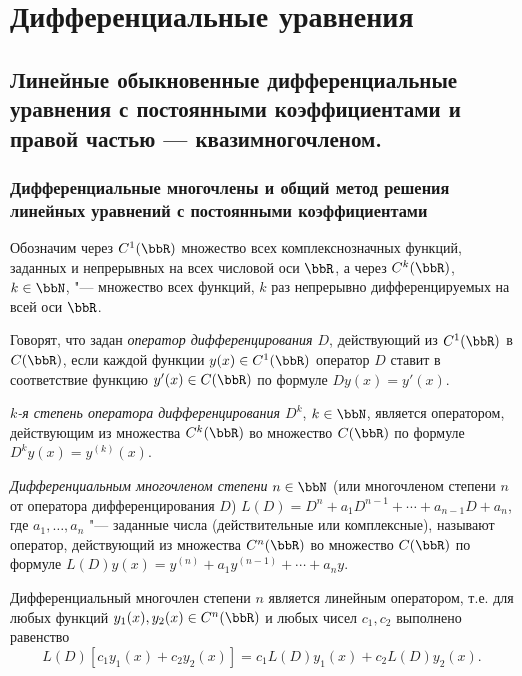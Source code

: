 \part[Дифференциальные уравнения]{Дифференциальные уравнения}%

\chapter{Линейные обыкновенные дифференциальные уравнения с постоянными коэффициентами и правой частью — квазимногочленом.}
\section{Дифференциальные многочлены и общий метод решения линейных уравнений с постоянными коэффициентами}
Обозначим через $C^1(\bbR)$ множество всех комплекснозначных функций, заданных и непрерывных на всех числовой оси $\bbR$, а через $C^k(\bbR)$, $k\in \bbN$, "--- множество всех функций, $k$ раз непрерывно дифференцируемых на всей оси $\bbR$.
\begin{defn} \label{ch26.1defn1}
Говорят, что задан \textit{оператор дифференцирования $D$}, действующий из $C^1(\bbR)$ в $C(\bbR)$, если каждой функции $y(x)\in C^1(\bbR)$ оператор $D$ ставит в соответствие функцию $y'(x) \in C(\bbR)$ по формуле $Dy(x)=y'(x)$.
\end{defn}

\begin{defn} \label{ch26.1defn2}
\textit{$k$-я степень оператора дифференцирования $D^k$}, $k\in \bbN$, является оператором, действующим из множества $C^k(\bbR)$ во множество $C(\bbR)$ по формуле $D^ky(x)=y^{(k)}(x)$.
\end{defn}

\begin{defn} \label{ch26.1defn3}
\textit{Дифференциальным многочленом степени} $n \in \bbN$ (или многочленом степени $n$ от оператора дифференцирования $D$) $L(D) = D^n + a_1D^{n-1}+\cdots+a_{n-1}D + a_n$, где $a_1, \dots , a_n$ "--- заданные числа (действительные или комплексные), называют оператор, действующий из множества $C^n(\bbR)$ во множество $C(\bbR)$ по формуле $L(D)y(x)=y^{(n)}+a_1y^{(n-1)}+\cdots+a_ny.$
\end{defn}

\begin{lemm} \label{ch26lemm1.1}
Дифференциальный многочлен степени $n$ является линейным оператором, т.е. для любых функций $y_1(x),y_2(x)\in C^n(\bbR)$ и любых чисел $c_1,c_2$ выполнено равенство
$$
L(D)[c_1y_1(x)+c_2y_2(x)]=c_1L(D)y_1(x)+c_2L(D)y_2(x).
$$ 
\end{lemm}

